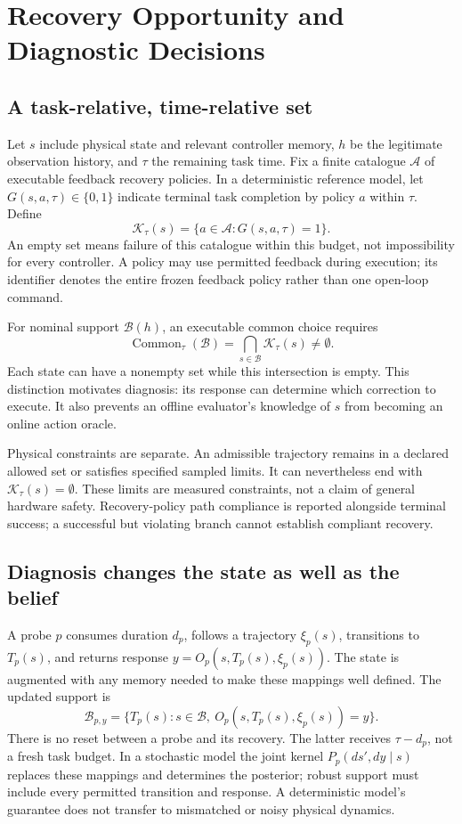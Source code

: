 \documentclass[conference]{IEEEtran}
\newcommand{\K}{\mathcal K}
\newcommand{\A}{\mathcal A}
\newcommand{\B}{\mathcal B}
\begin{document}
\section{Recovery Opportunity and Diagnostic Decisions}
\subsection{A task-relative, time-relative set}
Let $s$ include physical state and relevant controller memory, $h$ be the legitimate observation history, and $\tau$ the remaining task time. Fix a finite catalogue $\A$ of executable feedback recovery policies. In a deterministic reference model, let $G(s,a,\tau)\in\{0,1\}$ indicate terminal task completion by policy $a$ within $\tau$. Define
\begin{equation}
\K_\tau(s)=\{a\in\A:G(s,a,\tau)=1\}.\label{eq:K}
\end{equation}
An empty set means failure of this catalogue within this budget, not impossibility for every controller. A policy may use permitted feedback during execution; its identifier denotes the entire frozen feedback policy rather than one open-loop command.

For nominal support $\B(h)$, an executable common choice requires
\begin{equation}
\operatorname{Common}_\tau(\B)=\bigcap_{s\in\B}\K_\tau(s)\ne\emptyset.\label{eq:common}
\end{equation}
Each state can have a nonempty set while this intersection is empty. This distinction motivates diagnosis: its response can determine which correction to execute. It also prevents an offline evaluator's knowledge of $s$ from becoming an online action oracle.

Physical constraints are separate. An admissible trajectory remains in a declared allowed set or satisfies specified sampled limits. It can nevertheless end with $\K_\tau(s)=\emptyset$. These limits are measured constraints, not a claim of general hardware safety. Recovery-policy path compliance is reported alongside terminal success; a successful but violating branch cannot establish compliant recovery.

\subsection{Diagnosis changes the state as well as the belief}
A probe $p$ consumes duration $d_p$, follows a trajectory $\xi_p(s)$, transitions to $T_p(s)$, and returns response $y=O_p(s,T_p(s),\xi_p(s))$. The state is augmented with any memory needed to make these mappings well defined. The updated support is
\begin{equation}
\B_{p,y}=\{T_p(s):s\in\B,\ O_p(s,T_p(s),\xi_p(s))=y\}.\label{eq:update}
\end{equation}
There is no reset between a probe and its recovery. The latter receives $\tau-d_p$, not a fresh task budget. In a stochastic model the joint kernel $P_p(ds',dy\mid s)$ replaces these mappings and determines the posterior; robust support must include every permitted transition and response. A deterministic model's guarantee does not transfer to mismatched or noisy physical dynamics.
\end{document}
